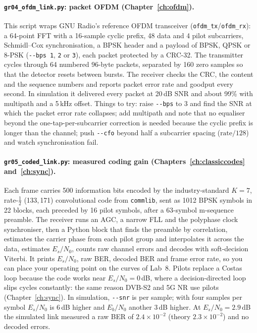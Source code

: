 \paragraph{\texttt{gr04\_ofdm\_link.py}: packet OFDM (Chapter~\ref{ch:ofdm}).} This script wraps GNU
Radio's reference OFDM transceiver (\texttt{ofdm\_tx}/\texttt{ofdm\_rx}): a 64-point FFT with a 16-sample
cyclic prefix, 48 data and 4 pilot subcarriers, Schmidl--Cox synchronisation, a BPSK header and a
payload of BPSK, QPSK or 8-PSK (\texttt{-{}-bps 1}, \texttt{2} or \texttt{3}), each packet protected by a
CRC-32. The transmitter cycles through 64 numbered 96-byte packets, separated by 160 zero samples so
that the detector resets between bursts. The receiver checks the CRC, the content and the sequence
numbers and reports packet error rate and goodput every second. In simulation it delivered every
packet at 20\,dB SNR and about 99\% with multipath and a 5\,kHz offset. Things to try: raise
\texttt{-{}-bps} to 3 and find the SNR at which the packet error rate collapses; add multipath and note
that no equaliser beyond the one-tap-per-subcarrier correction is needed because the cyclic prefix
is longer than the channel; push \texttt{-{}-cfo} beyond half a subcarrier spacing ($\text{rate}/128$)
and watch synchronisation fail.

\paragraph{\texttt{gr05\_coded\_link.py}: measured coding gain (Chapters~\ref{ch:classiccodes}
and~\ref{ch:sync}).} Each frame carries 500 information bits encoded by the industry-standard $K=7$,
rate-$\tfrac12$ (133,\,171) convolutional code from \texttt{commlib}, sent as 1012 BPSK symbols in 22
blocks, each preceded by 16 pilot symbols, after a 63-symbol m-sequence preamble. The receiver runs
an AGC, a narrow FLL and the polyphase clock synchroniser, then a Python block that finds the
preamble by correlation, estimates the carrier phase from each pilot group and interpolates it across
the data, estimates $E_s/N_0$, counts raw channel errors and decodes with soft-decision Viterbi. It
prints $E_s/N_0$, raw BER, decoded BER and frame error rate, so you can place your operating point on
the curves of Lab~8. Pilots replace a Costas loop because the code works near $E_s/N_0=0$\,dB, where
a decision-directed loop slips cycles constantly: the same reason DVB-S2 and 5G NR use pilots
(Chapter~\ref{ch:sync}). In simulation, \texttt{-{}-snr} is per sample; with four samples per symbol
$E_s/N_0$ is 6\,dB higher and $E_b/N_0$ another 3\,dB higher. At $E_s/N_0=2.9$\,dB the simulated link
measured a raw BER of $2.4\times10^{-2}$ (theory $2.3\times10^{-2}$) and no decoded errors.

